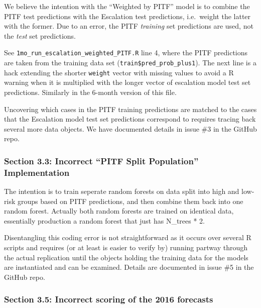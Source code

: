 \documentclass[
]{article}
\begin{document}
We believe the intention with the ``Weighted by PITF'' model is to combine the PITF test predictions with the Escalation test predictions, i.e.~weight the latter with the former. Due to an error, the PITF \emph{training} set predictions are used, not the \emph{test} set predictions.

See \texttt{1mo\_run\_escalation\_weighted\_PITF.R} line 4, where the PITF predictions are taken from the training data set (\texttt{train\$pred\_prob\_plus1}). The next line is a hack extending the shorter \texttt{weight} vector with missing values to avoid a R warning when it is multiplied with the longer vector of escalation model test set predictions. Similarly in the 6-month version of this file.

Uncovering which cases in the PITF training predictions are matched to the cases that the Escalation model test set predictions correspond to requires tracing back several more data objects. We have documented details in issue \#3 in the GitHub repo.

\hypertarget{section-3.3-incorrect-pitf-split-population-implementation}{%
\subsubsection{Section 3.3: Incorrect ``PITF Split Population'' Implementation}\label{section-3.3-incorrect-pitf-split-population-implementation}}

The intention is to train seperate random forests on data split into high and low-risk groups based on PITF predictions, and then combine them back into one random forest. Actually both random forests are trained on identical data, essentially production a random forest that just has N\_trees * 2.

Disentangling this coding error is not straightforward as it occurs over several R scripts and requires (or at least is easier to verify by) running partway through the actual replication until the objects holding the training data for the models are instantiated and can be examined. Details are documented in issue \#5 in the GitHub repo.

\hypertarget{section-3.5-incorrect-scoring-of-the-2016-forecasts}{%
\subsubsection{Section 3.5: Incorrect scoring of the 2016 forecasts}\label{section-3.5-incorrect-scoring-of-the-2016-forecasts}}
\end{document}
